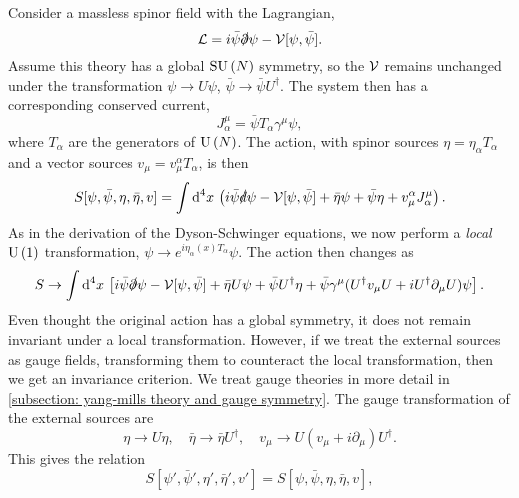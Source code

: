 Consider a massless spinor field with the Lagrangian,
%
\begin{equation}
    \mathcal{L} = i \bar \psi \slashed \partial \psi - \mathcal{V}[\psi, \bar \psi].
\end{equation}
%
Assume this theory has a global $\text{SU}\left(N\right)$ symmetry, so the $\mathcal{V}$ remains unchanged under the transformation $\psi \rightarrow U \psi$, $\bar \psi \rightarrow \bar \psi U^\dagger$.
The system then has a corresponding conserved current,
%
\begin{equation}
    J_\alpha^\mu = \bar \psi T_\alpha \gamma^\mu \psi,
\end{equation}
%
where $T_\alpha$ are the generators of $\text{U}\left(N\right)$.
The action, with spinor sources $\eta = \eta_\alpha T_\alpha$ and a vector sources $v_\mu = v_\mu^\alpha T_\alpha$, is then
%
\begin{equation}
    S[\psi, \bar \psi, \eta, \bar \eta, v]
    = 
    \int \text{d}^4 x \,
    \left(
        i \bar \psi \slashed d \psi - \mathcal{V}[\psi, \bar \psi]
        + \bar \eta \psi 
        + \bar \psi \eta + v_\mu^\alpha J^\mu_\alpha
    \right).
\end{equation}
%
As in the derivation of the Dyson-Schwinger equations, we now perform a \emph{local} $\text{U}\left(1\right)$ transformation, $\psi \rightarrow e^{i\eta_\alpha(x)T_\alpha} \psi$.
The action then changes as
%
\begin{equation}
    S \rightarrow 
    \int \text{d}^4 x \,
    \left[
        i \bar \psi \slashed \partial \psi 
        - \mathcal{V}[\psi, \bar \psi]
        + \bar \eta U \psi
        + \bar \psi U^\dagger \eta 
        + \bar \psi \gamma^\mu (U^\dagger v_\mu U + i U^\dagger \partial_\mu U)\psi
    \right].
\end{equation}
%
Even thought the original action has a global symmetry, it does not remain invariant under a local transformation.
However, if we treat the external sources as gauge fields, transforming them to counteract the local transformation, then we get an invariance criterion.
We treat gauge theories in more detail in \autoref{subsection: yang-mills theory and gauge symmetry}.
The gauge transformation of the external sources are
%
\begin{equation}
    \eta \rightarrow U \eta, \quad
    \bar \eta \rightarrow \bar \eta U^\dagger,\quad
    v_\mu \rightarrow U(v_\mu + i \partial_\mu) U^\dagger.
\end{equation}
%
This gives the relation
%
\begin{equation}
    \label{Equality for action Ward idientities}
    S[\psi', \bar \psi', \eta', \bar \eta', v'] =
    S[\psi, \bar \psi, \eta, \bar \eta, v],
\end{equation}
